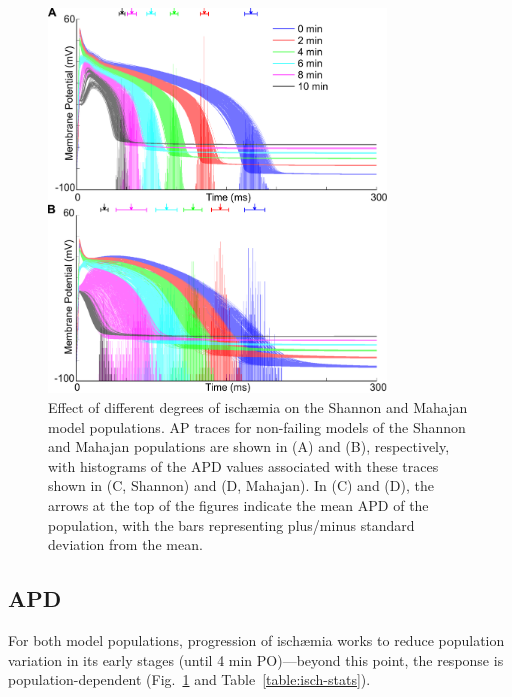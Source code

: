 \documentclass[../thesis-main.tex]{subfiles}
\begin{document}
\begin{figure}
 \centering
 \includegraphics[width=0.8\textwidth]{isch17-ap-apd90}
 \caption[Effect of different degrees of isch\ae{}mia on the Shannon and Mahajan model populations.]{Effect of different degrees of isch\ae{}mia on the Shannon and Mahajan model populations. AP traces for non-failing models of the Shannon and Mahajan populations are shown in (A) and (B), respectively, with histograms of the APD values associated with these traces shown in (C, Shannon) and (D, Mahajan). In (C) and (D), the arrows at the top of the figures indicate the mean APD of the population, with the bars representing plus/minus standard deviation from the mean.}
 \label{fig:isch-ap-apd90}
\end{figure}


\subsection{APD}
\label{subsec:isch-apd90-response}
For both model populations, progression of isch\ae{}mia works to reduce population variation in its early stages (until 4 min PO)---beyond this point, the response is population-dependent (Fig.~\ref{fig:isch-ap-apd90} and Table~\ref{table:isch-stats}).
\end{document}
